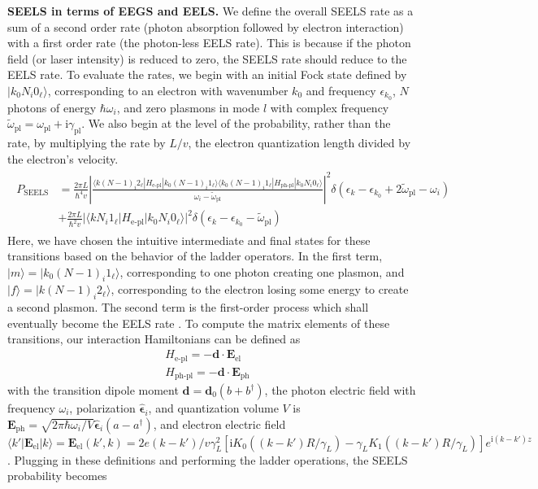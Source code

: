 \documentclass [11pt, proquest] {uwthesis}[2016/11/22]
\begin{document}
{\bf SEELS in terms of EEGS and EELS.} We define the overall SEELS rate as a sum of a second order rate (photon absorption followed by electron interaction) with a first order rate (the photon-less EELS rate). This is because if the photon field (or laser intensity) is reduced to zero, the SEELS rate should reduce to the EELS rate. To evaluate the rates, we begin with an initial Fock state defined by $|k_0N_i0_{\ell}\rangle$, corresponding to an electron with wavenumber $k_0$ and frequency $\epsilon_{k_0}$, $N$ photons of energy $\hbar\omega_i$, and zero plasmons in mode $l$ with complex frequency $\tilde{\omega}_{\textrm{pl}}=\omega_{\textrm{pl}}+\textrm{i}\gamma_{\textrm{pl}}$. We also begin at the level of the probability, rather than the rate, by multiplying the rate by $L/v$, the electron quantization length divided by the electron's velocity.
\begin{align}
\begin{split}
  P_{\textrm{SEELS}} &= \frac{2\pi L}{\hbar^4v}\left|\frac{\langle k(N-1)_i2_{\ell}|H_{\textrm{e-pl}}|k_0(N-1)_i1_{\ell}\rangle\langle k_0(N-1)_i1_{\ell}|H_{\textrm{ph-pl}}|k_0N_i0_{\ell}\rangle}{\omega_i - \tilde{\omega}_{\textrm{pl}}}\right|^2\delta(\epsilon_k - \epsilon_{k_0} + 2\tilde{\omega}_{\textrm{pl}} - \omega_i)\\
  &+ \frac{2\pi L}{\hbar^2v}|\langle kN_i1_{\ell}|H_{\textrm{e-pl}}|k_0N_i0_{\ell}\rangle|^2\delta(\epsilon_k - \epsilon_{k_0} - \tilde{\omega}_{\textrm{pl}})
  \label{overall_rate}
  \end{split}
\end{align}
Here, we have chosen the intuitive intermediate and final states for these transitions based on the behavior of the ladder operators. In the first term, $|m\rangle = |k_0(N-1)_i1_{\ell}\rangle$, corresponding to one photon creating one plasmon, and $|f\rangle = |k (N-1)_i 2_{\ell}\rangle$, corresponding to the electron losing some energy to create a second plasmon. The second term is the first-order process which shall eventually become the EELS rate \cite{EEGS}. To compute the matrix elements of these transitions, our interaction Hamiltonians can be defined as
\begin{equation}
\begin{aligned}
H_{\textrm{e-pl}} = -\textbf{d} \cdot \textbf{E}_{\textrm{el}}&\\
H_{\textrm{ph-pl}} = -\textbf{d} \cdot \textbf{E}_{\textrm{ph}}&
\end{aligned}
\end{equation}
with the transition dipole moment $\textbf{d} = \textbf{d}_0(b + b^{\dagger})$, the photon electric field with frequency $\omega_i$, polarization $\hat{\boldsymbol{\epsilon}}_i$, and quantization volume $V$ is $\textbf{E}_{\textrm{ph}} = \sqrt{2\pi\hbar\omega_i/V}\hat{\boldsymbol{\epsilon}}_i(a - a^{\dagger})$, and electron electric field $\langle k'|\textbf{E}_{\textrm{el}}|k\rangle = \textbf{E}_{\textrm{el}}(k',k) = 2e(k-k')/v\gamma_L^2[\textrm{i}K_0((k-k') R/\gamma_L)-\gamma_LK_1((k-k') R/\gamma_L)]e^{\textrm{i}(k-k') z}$. Plugging in these definitions and performing the ladder operations, the SEELS probability becomes
\end{document}
